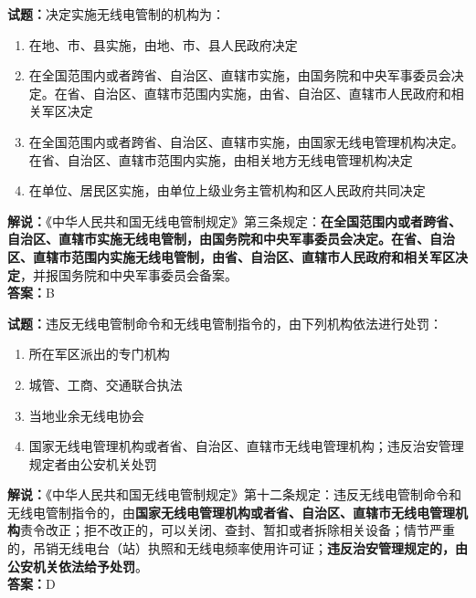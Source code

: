 \documentclass{ctexbook}
\begin{document}
\bigskip


\noindent\textbf{试题：}决定实施无线电管制的机构为：
\begin{enumerate}[leftmargin=3em]
\item 在地、市、县实施，由地、市、县人民政府决定
\item 在全国范围内或者跨省、自治区、直辖市实施，由国务院和中央军事委员会决定。在省、自治区、直辖市范围内实施，由省、自治区、直辖市人民政府和相关军区决定
\item 在全国范围内或者跨省、自治区、直辖市实施，由国家无线电管理机构决定。在省、自治区、直辖市范围内实施，由相关地方无线电管理机构决定
\item 在单位、居民区实施，由单位上级业务主管机构和区人民政府共同决定
\end{enumerate}
\noindent\textbf{解说：}《中华人民共和国无线电管制规定》第三条规定：\textbf{在全国范围内或者跨省、自治区、直辖市实施无线电管制，由国务院和中央军事委员会决定。在省、自治区、直辖市范围内实施无线电管制，由省、自治区、直辖市人民政府和相关军区决定}，并报国务院和中央军事委员会备案。\\\noindent\textbf{答案：}B



\bigskip


\noindent\textbf{试题：}违反无线电管制命令和无线电管制指令的，由下列机构依法进行处罚：
\begin{enumerate}[leftmargin=3em]
\item 所在军区派出的专门机构
\item 城管、工商、交通联合执法
\item 当地业余无线电协会
\item 国家无线电管理机构或者省、自治区、直辖市无线电管理机构；违反治安管理规定者由公安机关处罚
\end{enumerate}
\noindent\textbf{解说：}《中华人民共和国无线电管制规定》第十二条规定：违反无线电管制命令和无线电管制指令的，由\textbf{国家无线电管理机构或者省、自治区、直辖市无线电管理机构}责令改正；拒不改正的，可以关闭、查封、暂扣或者拆除相关设备；情节严重的，吊销无线电台（站）执照和无线电频率使用许可证；\textbf{违反治安管理规定的，由公安机关依法给予处罚}。\\\noindent\textbf{答案：}D



\bigskip
\end{document}
